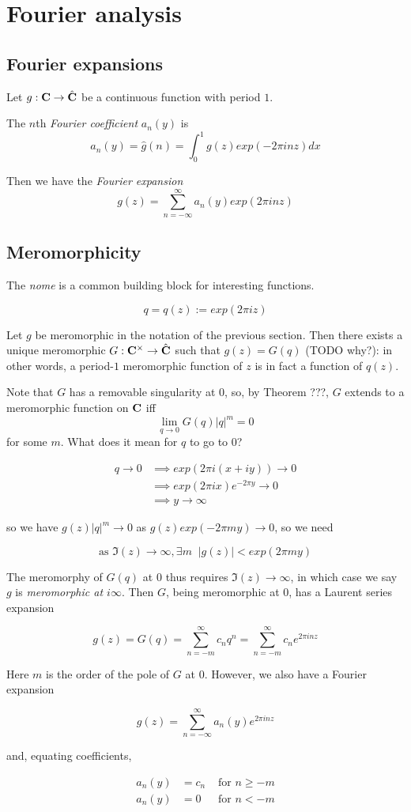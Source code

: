 \chapter{Fourier analysis}

\section{Fourier expansions}
\label{sec:fourier-expansions}

Let $g : \mathbf{C} \to \hat{\mathbf{C}}$ be a continuous function with period $1$.

The $n$th \emph{Fourier coefficient} $a_n(y)$ is
\[ a_n(y) = \hat g(n) = \int_0^1 g(z) exp(-2\pi i n z) dx \]

Then we have the \emph{Fourier expansion}
\[ g(z) = \sum_{n=-\infty}^\infty a_n(y) exp(2\pi inz) \]

\section{Meromorphicity}
\label{sec:meromorphicity}

The \emph{nome} is a common building block for interesting functions.

\[ q = q(z) := exp(2 \pi i z) \]

Let $g$ be meromorphic in the notation of the previous section. Then there
exists a unique meromorphic $G : \mathbf{C}^\times \to \hat{\mathbf{C}}$ such that $g(z) =
G(q)$ (TODO why?): in other words, a period-$1$ meromorphic function of $z$ is in fact a
function of $q(z)$.

Note that $G$ has a removable singularity at $0$, so, by Theorem ???, $G$
extends to a meromorphic function on $\mathbf{C}$ iff
\[ \lim_{q\to0} G(q) |q|^m = 0\] for some $m$. What does it mean for $q$ to go
to $0$?

\begin{align*}
  q \to 0 &\implies exp(2\pi i(x+iy)) \to 0\\
          &\implies exp(2\pi i x) e^{-2 \pi y} \to 0\\
          &\implies y \to \infty
\end{align*}

so we have \( g(z)|q|^m \to 0\) as \( g(z) exp(-2\pi m y) \to 0 \), so we need

\[ \text{as } \Im(z) \to \infty, \exists m\;\; |g(z)| < exp(2\pi my) \]

The meromorphy of $G(q)$ at $0$ thus requires $\Im(z)\to\infty$, in which case
we say $g$ is \emph{meromorphic at $i\infty$}. Then $G$, being meromorphic at
$0$, has a Laurent series expansion

\[ g(z) = G(q) = \sum_{n=-m}^\infty c_nq^n = \sum_{n=-m}^\infty c_n e^{2\pi inz} \]

Here $m$ is the order of the pole of $G$ at $0$. However, we also have a Fourier
expansion

\[ g(z) = \sum_{n=-\infty}^\infty a_n(y) e^{2\pi inz} \]

and, equating coefficients,

\begin{align*}
  a_n(y) &= c_n &\text{ for } n\ge -m\\
  a_n(y) &= 0   &\text{ for } n < -m
\end{align*}
